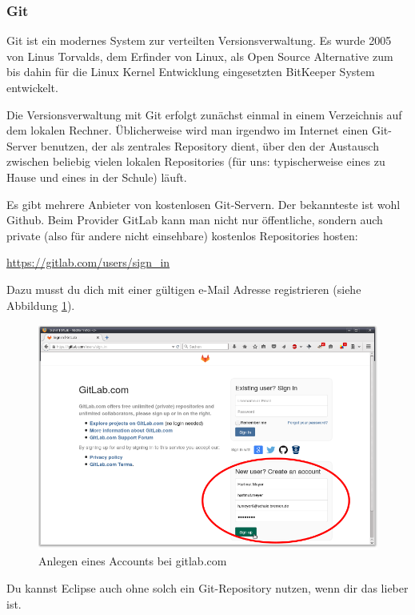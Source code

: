 \subsubsection{Git}

Git ist ein modernes System zur verteilten Versionsverwaltung. Es wurde 2005 von
Linus Torvalds, dem Erfinder von Linux, als Open Source Alternative zum bis
dahin für die Linux Kernel Entwicklung eingesetzten BitKeeper System entwickelt.

Die Versionsverwaltung mit Git erfolgt zunächst einmal in einem Verzeichnis auf
dem lokalen Rechner. Üblicherweise wird man irgendwo im Internet einen
Git-Server benutzen, der als zentrales Repository dient, über den der Austausch
zwischen beliebig vielen lokalen Repositories (für uns: typischerweise eines zu
Hause und eines in der Schule) läuft.

Es gibt mehrere Anbieter von kostenlosen Git-Servern. Der bekannteste ist
wohl Github. Beim Provider GitLab kann man nicht nur öffentliche,
sondern auch private (also für andere nicht einsehbare) kostenlos Repositories
hosten:

\url{https://gitlab.com/users/sign_in}

Dazu musst du dich mit einer gültigen e-Mail Adresse registrieren (siehe
Abbildung \ref{fig:gitlab-account-creation}).

\begin{figure}[h]
  \centering
   \includegraphics[width=1.0\textwidth]{./inf/SEKII/01_Vorbereitung/GitLab_Account_Creation.png}
   \caption{Anlegen eines Accounts bei gitlab.com}
   \label{fig:gitlab-account-creation}
\end{figure}

Du kannst Eclipse auch ohne solch ein Git-Repository nutzen, wenn dir
das lieber ist.

